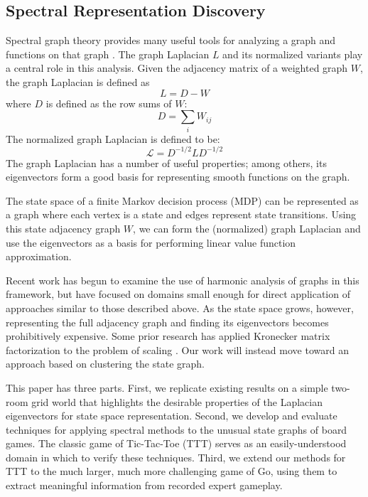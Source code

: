 \subsection{Spectral Representation Discovery}

Spectral graph theory provides many useful tools for analyzing a graph and
functions on that graph \citep{Chung1997Spectral}. The graph Laplacian $L$ and
its normalized variants play a central role in this analysis. Given the
adjacency matrix of a weighted graph $W$, the graph Laplacian is defined as
%
\begin{equation}
L = D-W
\end{equation}
%
where $D$ is defined as the row sums of $W$:
%
\begin{equation}
D = \sum_{i} W_{ij}
\end{equation}
%
The normalized graph Laplacian is defined to be:
%
\begin{equation}
\mathcal{L} = D^{-1/2}LD^{-1/2}
\label{eqn:norm.laplacian}
\end{equation}
%
The graph Laplacian has a number of useful properties; among others, its
eigenvectors form a good basis for representing smooth functions on the graph.

The state space of a finite Markov decision process (MDP) can be represented
as a graph where each vertex is a state and edges represent state transitions.
Using this state adjacency graph $W$, we can form the (normalized) graph 
Laplacian and use the eigenvectors as a basis for performing linear value 
function approximation.

Recent work
\citep{petrik2007analysis,mahadevan2006learning,Mahadevan2006Value,mahadevan2007proto}
has begun to examine the use of harmonic analysis of graphs in this framework,
but have focused on domains small enough for direct application of approaches
similar to those described above. As the state space grows, however,
representing the full adjacency graph and finding its eigenvectors becomes
prohibitively expensive. Some prior research has applied Kronecker matrix
factorization to the problem of scaling \citep{johns2007compact}. Our work will
instead move toward an approach based on clustering the state graph.

This paper has three parts. First, we replicate existing results on a simple
two-room grid world that highlights the desirable properties of the Laplacian
eigenvectors for state space representation. Second, we develop and evaluate
techniques for applying spectral methods to the unusual state graphs of board
games. The classic game of Tic-Tac-Toe (TTT) serves as an easily-understood
domain in which to verify these techniques. Third, we extend our methods for
TTT to the much larger, much more challenging game of Go, using them to extract
meaningful information from recorded expert gameplay.

